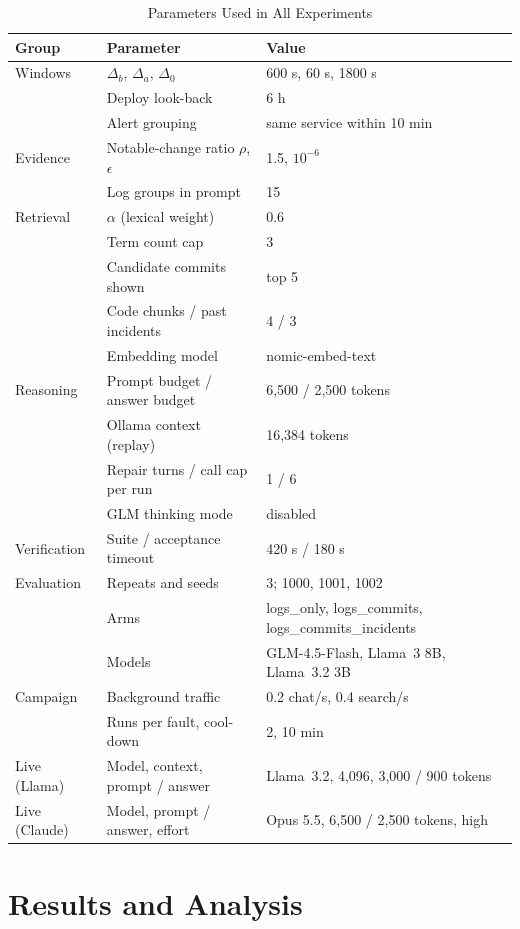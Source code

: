 \documentclass[12pt,onecolumn,draftclsnofoot]{IEEEtran}
\begin{document}
\begin{table}[!t]
\caption{Parameters Used in All Experiments}
\label{tab:params}
\centering
\small
\begin{tabular}{lll}
\toprule
\textbf{Group} & \textbf{Parameter} & \textbf{Value} \\
\midrule
Windows & $\Delta_b$, $\Delta_a$, $\Delta_0$ & 600 s, 60 s, 1800 s \\
 & Deploy look-back & 6 h \\
 & Alert grouping & same service within 10 min \\
Evidence & Notable-change ratio $\rho$, $\epsilon$ & 1.5, $10^{-6}$ \\
 & Log groups in prompt & 15 \\
Retrieval & $\alpha$ (lexical weight) & 0.6 \\
 & Term count cap & 3 \\
 & Candidate commits shown & top 5 \\
 & Code chunks / past incidents & 4 / 3 \\
 & Embedding model & nomic-embed-text \\
Reasoning & Prompt budget / answer budget & 6,500 / 2,500 tokens \\
 & Ollama context (replay) & 16,384 tokens \\
 & Repair turns / call cap per run & 1 / 6 \\
 & GLM thinking mode & disabled \\
Verification & Suite / acceptance timeout & 420 s / 180 s \\
Evaluation & Repeats and seeds & 3; 1000, 1001, 1002 \\
 & Arms & logs\_only, logs\_commits, logs\_commits\_incidents \\
 & Models & GLM-4.5-Flash, Llama~3 8B, Llama~3.2 3B \\
Campaign & Background traffic & 0.2 chat/s, 0.4 search/s \\
 & Runs per fault, cool-down & 2, 10 min \\
Live (Llama) & Model, context, prompt / answer & Llama~3.2, 4,096, 3,000 / 900 tokens \\
Live (Claude) & Model, prompt / answer, effort & Opus 5.5, 6,500 / 2,500 tokens, high \\
\bottomrule
\end{tabular}
\end{table}

\section{Results and Analysis}\label{sec:results}
\end{document}
